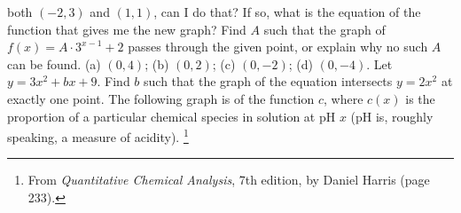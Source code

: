 \begin{questions}
            both $ (-2, 3) $ and $ (1,1) $, can I do that? If so, what is the equation of the function that gives me the new graph?
  \question Find $ A $ such that the graph of $ f(x) = A \cdot 3^{x - 1} + 2 $ passes through the given point, or explain why no such $ A $ can be found.
            (a) $ (0,4) $; (b) $ (0,2) $; (c) $ (0,-2) $; (d) $ (0,-4) $.
  \question Let $ y = 3x^2 + bx + 9 $. Find $ b $ such that the graph of the equation intersects $ y = 2x^2 $ at exactly one point.
  \question The following graph is of the function $ c $, where $ c(x) $ is the proportion of a particular chemical species in solution
            at pH $ x $ (pH is, roughly speaking, a measure of acidity). \footnote{From \emph{Quantitative Chemical Analysis}, 7th edition,
            by Daniel Harris (page 233).}
            \begin{center}
          \end{center}
\end{questions}

